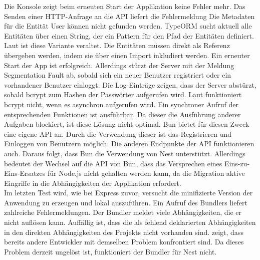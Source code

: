 \noindent
Die Konsole zeigt beim erneuten Start der Applikation keine Fehler mehr. Das Senden einer HTTP-Anfrage an die API liefert die Fehlermeldung \glq Die Metadaten für die Entität User können nicht gefunden werden\grq{}. TypeORM sucht aktuell alle Entitäten über einen String, der ein Pattern für den Pfad der Entitäten definiert. Laut \cite{TypeORM.2021} ist diese Variante veraltet. Die Entitäten müssen direkt als Referenz übergeben werden, indem sie über einen Import inkludiert werden. \newline
Ein erneuter Start der App ist erfolgreich. Allerdings stürzt der Server mit der Meldung \glq Segmentation Fault\grq{} ab, sobald sich ein neuer Benutzer registriert oder ein vorhandener Benutzer einloggt. Die Log-Einträge zeigen, dass der Server abstürzt, sobald \glq bcrypt\grq{} zum Hashen der Passwörter aufgerufen wird. Laut \cite{Sumner.2023} funktioniert \glq bcrypt\grq{} nicht, wenn es asynchron aufgerufen wird. Ein synchroner Aufruf der entsprechenden Funktionen ist ausführbar. Da dieser die Ausführung anderer Aufgaben blockiert, ist diese Lösung nicht optimal. Bun bietet für diesen Zweck eine eigene API an. Durch die Verwendung dieser ist das Registrieren und Einloggen von Benutzern möglich. Die anderen Endpunkte der API funktionieren auch. Daraus folgt, dass Bun die Verwendung von Nest unterstützt. Allerdings bedeutet der Wechsel auf die API von Bun, dass das Versprechen eines Eins-zu-Eins-Ersatzes für Node.js nicht gehalten werden kann, da die Migration aktive Eingriffe in die Abhängigkeiten der Applikation erfordert.\\

\noindent
Im letzten Test wird, wie bei Express zuvor, versucht die minifizierte Version der Anwendung zu erzeugen und lokal auszuführen. Ein Aufruf des Bundlers liefert zahlreiche Fehlermeldungen. Der Bundler meldet viele Abhängigkeiten, die er nicht auflösen kann. Auffällig ist, dass die als fehlend deklarierten Abhängigkeiten in den direkten Abhängigkeiten des Projekts nicht vorhanden sind. \cite{Postek.2023} zeigt, dass bereits andere Entwickler mit demselben Problem konfrontiert sind. Da dieses Problem derzeit ungelöst ist, funktioniert der Bundler für Nest nicht.

